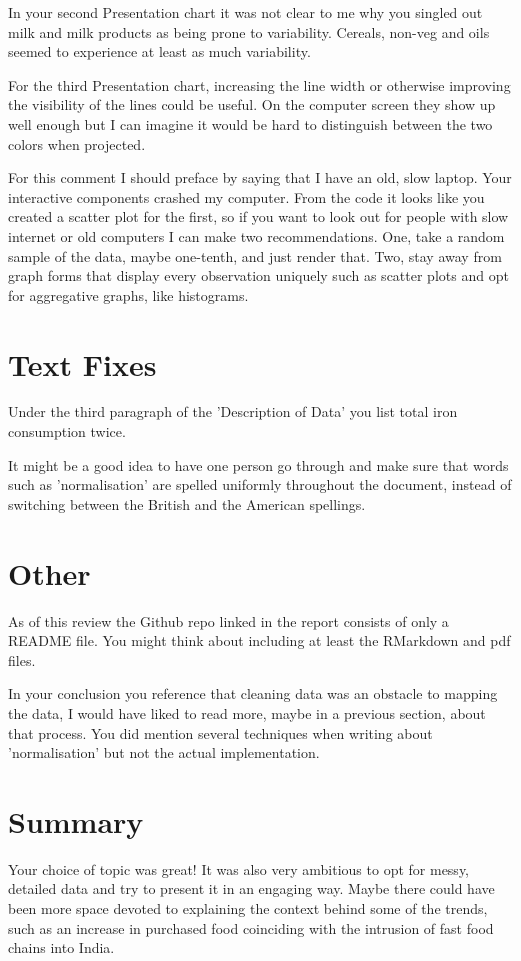 \documentclass{article}
\begin{document}
In your second Presentation chart it was not clear to me why you singled out milk and milk products as being prone to variability. Cereals, non-veg and oils seemed to experience at least as much variability.

For the third Presentation chart, increasing the line width or otherwise improving the visibility of the lines could be useful. On the computer screen they show up well enough but I can imagine it would be hard to distinguish between the two colors when projected.

For this comment I should preface by saying that I have an old, slow laptop. Your interactive components crashed my computer. From the code it looks like you created a scatter plot for the first, so if you want to look out for people with slow internet or old computers I can make two recommendations. One, take a random sample of the data, maybe one-tenth, and just render that. Two, stay away from graph forms that display every observation uniquely such as scatter plots and opt for aggregative graphs, like histograms.

\section{Text Fixes}
Under the third paragraph of the 'Description of Data' you list total iron consumption twice.

It might be a good idea to have one person go through and make sure that words such as 'normalisation' are spelled uniformly throughout the document, instead of switching between the British and the American spellings.

\section{Other}
As of this review the Github repo linked in the report consists of only a README file. You might think about including at least the RMarkdown and pdf files.

In your conclusion you reference that cleaning data was an obstacle to mapping the data, I would have liked to read more, maybe in a previous section, about that process. You did mention several techniques when writing about 'normalisation' but not the actual implementation.

\section{Summary}
Your choice of topic was great! It was also very ambitious to opt for messy, detailed data and try to present it in an engaging way. Maybe there could have been more space devoted to explaining the context behind some of the trends, such as an increase in purchased food coinciding with the intrusion of fast food chains into India.
\end{document}
